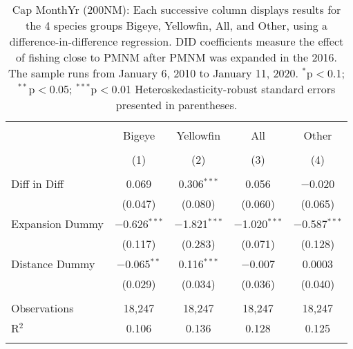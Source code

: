
\begin{table}[!htbp] \centering 
  \caption{Cap MonthYr (200NM): Each successive column displays results for the 4 species groups Bigeye, Yellowfin, All, and Other, using a difference-in-difference regression. DID coefficients measure the effect of fishing close to PMNM after PMNM was expanded in the 2016. The sample runs from January 6, 2010 to January 11, 2020. $^{*}$p$<$0.1; $^{**}$p$<$0.05; $^{***}$p$<$0.01 Heteroskedasticity-robust standard errors presented in parentheses.} 
  \label{tbl:timeFE200NM} 
\begin{tabular}{@{\extracolsep{5pt}}lcccc} 
\\[-1.8ex]\hline 
\hline \\[-1.8ex] 
 & Bigeye & Yellowfin & All & Other \\ 
\\[-1.8ex] & (1) & (2) & (3) & (4)\\ 
\hline \\[-1.8ex] 
 Diff in Diff & 0.069 & 0.306$^{***}$ & 0.056 & $-$0.020 \\ 
  & (0.047) & (0.080) & (0.060) & (0.065) \\ 
  Expansion Dummy & $-$0.626$^{***}$ & $-$1.821$^{***}$ & $-$1.020$^{***}$ & $-$0.587$^{***}$ \\ 
  & (0.117) & (0.283) & (0.071) & (0.128) \\ 
  Distance Dummy & $-$0.065$^{**}$ & 0.116$^{***}$ & $-$0.007 & 0.0003 \\ 
  & (0.029) & (0.034) & (0.036) & (0.040) \\ 
 \hline \\[-1.8ex] 
Observations & 18,247 & 18,247 & 18,247 & 18,247 \\ 
R$^{2}$ & 0.106 & 0.136 & 0.128 & 0.125 \\ 
\hline 
\hline \\[-1.8ex] 
\end{tabular} 
\end{table} 

